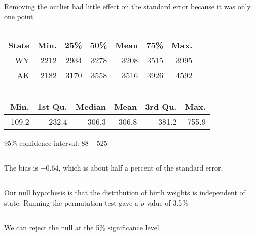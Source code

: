 \documentclass[twocolumn]{article}
\begin{document}
\subsection{}
Removing the outlier had little effect on the standard error because it was only one point.

\newpage

\subsection{}
\begin{table}[h]
\begin{tabular}{@{}rrrrrrr@{}}
\toprule
State & Min. & 25\% & 50\% & Mean & 75\% & Max. \\ \midrule
WY    & 2212 & 2934    & 3278   & 3208 & 3515    & 3995 \\
AK    & 2182 & 3170    & 3558   & 3516 & 3926    & 4592 \\ \bottomrule
\end{tabular}
\end{table}

\subsection{}
\begin{table}[h]
\begin{tabular}{@{}rrrrrr@{}}
\toprule
Min.   & 1st Qu. & Median & Mean  & 3rd Qu. & Max.  \\ \midrule
-109.2 & 232.4   & 306.3  & 306.8 & 381.2   & 755.9 \\ \bottomrule
\end{tabular}
\end{table}
95\% confidence interval: 88 -- 525

\subsection{}
The bias is $-0.64$, which is about half a percent of the standard error.

\subsection{}
Our null hypothesis is that the distribution of birth weights is independent of state. Running the permutation test gave a $p$-value of 3.5\%

\subsection{}
We can reject the null at the 5\% significance level.
\end{document}
